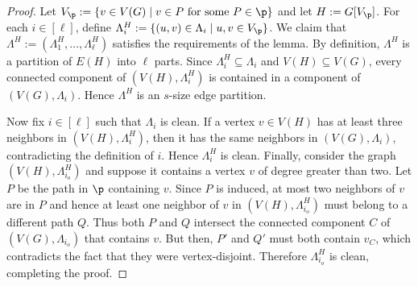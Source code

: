 \begin{proof}
    Let $V_{\p} := \{v \in V(G) \mid v \in P \text{ for some } P \in \p\}$ and let $H := G[V_{\p}]$. For each $i \in [\ell]$, define $\Lambda^H_i := \{(u,v) \in \Lambda_i \mid u,v \in V_{\p}\}$. We claim that $\Lambda^H := (\Lambda^H_1,\dots,\Lambda^H_\ell)$ satisfies the requirements of the lemma.
    By definition, $\Lambda^H$ is a partition of $E(H)$ into $\ell$ parts. Since $\Lambda^H_i \subseteq \Lambda_i$ and $V(H) \subseteq V(G)$, every connected component of $(V(H),\Lambda^H_i)$ is contained in a component of $(V(G),\Lambda_i)$. Hence $\Lambda^H$ is an $s$-size edge partition.
     
    Now fix $i \in [\ell]$ such that $\Lambda_i$ is clean. If a vertex $v \in V(H)$ has at least three neighbors in $(V(H),\Lambda^H_i)$, then it has the same neighbors in $(V(G),\Lambda_i)$, contradicting the definition of $i$. Hence $\Lambda^H_i$ is clean.
    Finally, consider the graph $(V(H),\Lambda^H_{i_o})$ and suppose it contains a vertex $v$ of degree greater than two. Let $P$ be the path in $\p$ containing $v$. Since $P$ is induced, at most two neighbors of $v$ are in $P$ and hence at least one neighbor of $v$ in $(V(H),\Lambda^H_{i_o})$ must belong to a different path $Q$. Thus both $P$ and $Q$ intersect the connected component $C$ of $(V(G),\Lambda_{i_o})$ that contains $v$. But then, $P'$ and $Q'$ must both contain $v_C$, which contradicts the fact that they were vertex-disjoint. Therefore $\Lambda^H_{i_o}$ is clean, completing the proof.
\end{proof}

